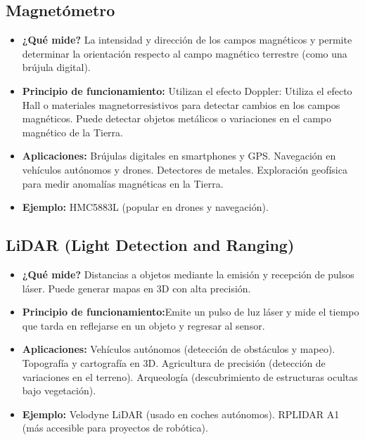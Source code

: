\subsection*{Magnetómetro}
\begin{itemize}
	\item \textbf{¿Qué mide?} La intensidad y dirección de los campos magnéticos y permite determinar la orientación respecto al campo magnético terrestre (como una brújula digital).
	\item \textbf{Principio de funcionamiento:} Utilizan el efecto Doppler: Utiliza el efecto Hall o materiales magnetorresistivos para detectar cambios en los campos magnéticos.
	Puede detectar objetos metálicos o variaciones en el campo magnético de la Tierra.
	\item \textbf{Aplicaciones:} Brújulas digitales en smartphones y GPS.
	Navegación en vehículos autónomos y drones.
	Detectores de metales.
	Exploración geofísica para medir anomalías magnéticas en la Tierra.
	\item \textbf{Ejemplo:} HMC5883L (popular en drones y navegación).
\end{itemize}
\subsection*{LiDAR (Light Detection and Ranging)}
\begin{itemize}
	\item \textbf{¿Qué mide?} Distancias a objetos mediante la emisión y recepción de pulsos láser.
	Puede generar mapas en 3D con alta precisión.
	\item \textbf{Principio de funcionamiento:}Emite un pulso de luz láser y mide el tiempo que tarda en reflejarse en un objeto y regresar al sensor.
	\item \textbf{Aplicaciones:} Vehículos autónomos (detección de obstáculos y mapeo).
	Topografía y cartografía en 3D.
	Agricultura de precisión (detección de variaciones en el terreno).
	Arqueología (descubrimiento de estructuras ocultas bajo vegetación).
	\item \textbf{Ejemplo:} Velodyne LiDAR (usado en coches autónomos).
	RPLIDAR A1 (más accesible para proyectos de robótica).
\end{itemize}
